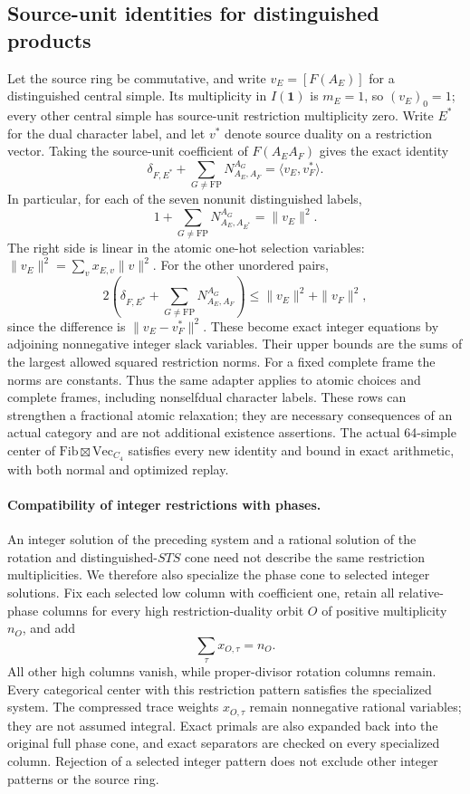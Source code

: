 \subsection{Source-unit identities for distinguished products}
Let the source ring be commutative, and write $v_E=[F(A_E)]$ for a
distinguished central simple. Its multiplicity in $I(\mathbf1)$ is
$m_E=1$, so $(v_E)_0=1$; every other central simple has source-unit
restriction multiplicity zero. Write $E^*$ for the dual character label,
and let $v^*$ denote source duality on a restriction vector. Taking the
source-unit coefficient of $F(A_EA_F)$ gives the exact identity
\[
 \delta_{F,E^*}+\sum_{G\ne\mathrm{FP}}N_{A_E,A_F}^{A_G}
 =\langle v_E,v_F^*\rangle.
\]
In particular, for each of the seven nonunit distinguished labels,
\[
 1+\sum_{G\ne\mathrm{FP}}N_{A_E,A_{E^*}}^{A_G}=\|v_E\|^2.
\]
The right side is linear in the atomic one-hot selection variables:
$\|v_E\|^2=\sum_v x_{E,v}\|v\|^2$. For the other unordered pairs,
\[
 2\left(\delta_{F,E^*}+\sum_{G\ne\mathrm{FP}}N_{A_E,A_F}^{A_G}\right)
 \leq\|v_E\|^2+\|v_F\|^2,
\]
since the difference is $\|v_E-v_F^*\|^2$. These become exact integer
equations by adjoining nonnegative integer slack variables. Their upper
bounds are the sums of the largest allowed squared restriction norms.
For a fixed complete frame the norms are constants. Thus the same adapter
applies to atomic choices and complete frames, including nonselfdual
character labels. These rows can strengthen a fractional atomic
relaxation; they are necessary consequences of an actual category and are
not additional existence assertions. The actual 64-simple center of
$\mathrm{Fib}\boxtimes\mathrm{Vec}_{C_4}$ satisfies every new identity
and bound in exact arithmetic, with both normal and optimized replay.

\paragraph{Compatibility of integer restrictions with phases.}
An integer solution of the preceding system and a rational solution of the
rotation and distinguished-$STS$ cone need not describe the same restriction
multiplicities. We therefore also specialize the phase cone to selected
integer solutions. Fix each selected low column with coefficient one, retain
all relative-phase columns for every high restriction-duality orbit $O$ of
positive multiplicity $n_O$, and add
\[
 \sum_{\tau}x_{O,\tau}=n_O.
\]
All other high columns vanish, while proper-divisor rotation columns remain.
Every categorical center with this restriction pattern satisfies the
specialized system. The compressed trace weights $x_{O,\tau}$ remain
nonnegative rational variables; they are not assumed integral. Exact primals
are also expanded back into the original full phase cone, and exact
separators are checked on every specialized column. Rejection of a selected
integer pattern does not exclude other integer patterns or the source ring.


